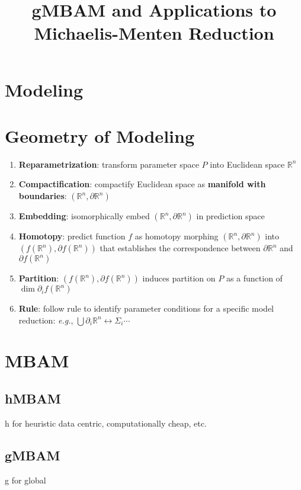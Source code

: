 \documentclass{article}
\title{gMBAM and Applications to Michaelis-Menten Reduction}
\begin{document}
\maketitle

\section{Modeling}

\section{Geometry of Modeling}
\begin{enumerate}
\item \textbf{Reparametrization}: transform parameter space $P$ into Euclidean space $\mathbb{R}^n$
\item \textbf{Compactification}: compactify Euclidean space as \textbf{manifold with boundaries}: $(\mathbb{R}^n, \partial \mathbb{R}^n)$
\item \textbf{Embedding}: isomorphically embed $(\mathbb{R}^n, \partial \mathbb{R}^n)$ in prediction space
\item \textbf{Homotopy}: predict function $f$ as homotopy morphing $(\mathbb{R}^n, \partial \mathbb{R}^n)$ into $(f(\mathbb{R}^n), \partial f(\mathbb{R}^n))$ that establishes the correspondence between $\partial \mathbb{R}^n$ and $\partial f(\mathbb{R}^n)$
\item \textbf{Partition}: $(f(\mathbb{R}^n), \partial f(\mathbb{R}^n))$ induces partition on $P$ as a function of $\dim \partial_i f(\mathbb{R}^n)$
\item \textbf{Rule}: follow rule to identify parameter conditions for a specific model reduction: \textit{e.g.}, $\bigcup \partial_i \mathbb{R}^n \leftrightarrow \Sigma_i \cdots$ 
\end{enumerate}

\section{MBAM}
\subsection{hMBAM}
h for heuristic
data centric, computationally cheap, etc.


\subsection{gMBAM}
g for global
\end{document}
